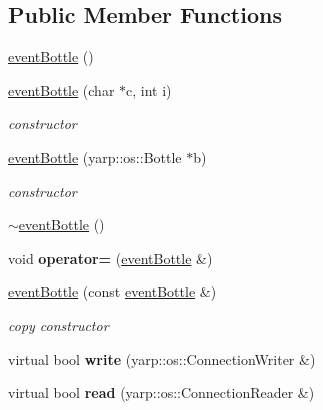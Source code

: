 \subsection*{Public Member Functions}
\begin{DoxyCompactItemize}
\item 
\hyperlink{classeventBottle_aa1fbb7e85119920debfccc223f2843f1}{event\-Bottle} ()
\item 
\hyperlink{classeventBottle_a44740910c0137e62aa3b4c3860109497}{event\-Bottle} (char $\ast$c, int i)
\begin{DoxyCompactList}\small\item\em constructor \end{DoxyCompactList}\item 
\hyperlink{classeventBottle_a29410be24e171cf5d73ee073712b062e}{event\-Bottle} (yarp\-::os\-::\-Bottle $\ast$b)
\begin{DoxyCompactList}\small\item\em constructor \end{DoxyCompactList}\item 
\hyperlink{classeventBottle_a2c1c9f1259b33b74f8e0b9111df47a39}{$\sim$event\-Bottle} ()
\item 
\hypertarget{classeventBottle_aa238f06090b0fb1e25592f8a188401d9}{void {\bfseries operator=} (\hyperlink{classeventBottle}{event\-Bottle} \&)}\label{classeventBottle_aa238f06090b0fb1e25592f8a188401d9}

\item 
\hypertarget{classeventBottle_a7cf605ab90defeb9da312a91eb55ac46}{\hyperlink{classeventBottle_a7cf605ab90defeb9da312a91eb55ac46}{event\-Bottle} (const \hyperlink{classeventBottle}{event\-Bottle} \&)}\label{classeventBottle_a7cf605ab90defeb9da312a91eb55ac46}

\begin{DoxyCompactList}\small\item\em copy constructor \end{DoxyCompactList}\item 
\hypertarget{classeventBottle_a524fd9080ab98e87f89e548c83c695fa}{virtual bool {\bfseries write} (yarp\-::os\-::\-Connection\-Writer \&)}\label{classeventBottle_a524fd9080ab98e87f89e548c83c695fa}

\item 
\hypertarget{classeventBottle_a2601d1ced98aea595bec4917c680fe71}{virtual bool {\bfseries read} (yarp\-::os\-::\-Connection\-Reader \&)}\label{classeventBottle_a2601d1ced98aea595bec4917c680fe71}


\end{DoxyCompactItemize}
